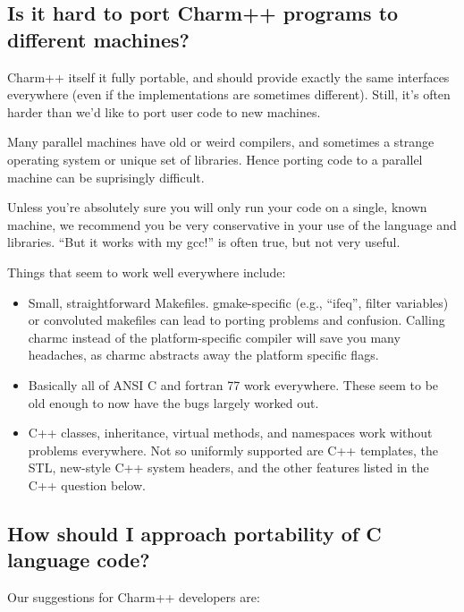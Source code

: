 \subsection{Is it hard to port Charm++ programs to different machines?}

\label{porting}
Charm++ itself it fully portable, and should provide exactly 
the same interfaces everywhere (even if the implementations are 
sometimes different).  Still, it's often harder than we'd like
to port user code to new machines.

Many parallel machines have old or weird compilers, and 
sometimes a strange operating system or unique set of libraries.  
Hence porting code to a parallel machine can be suprisingly difficult.

Unless you're absolutely sure you will only run your code on a
single, known machine, we recommend you be very conservative in 
your use of the language and libraries.  ``But it works with my gcc!''
is often true, but not very useful.

Things that seem to work well everywhere include:
\begin{itemize}
\item Small, straightforward Makefiles.  gmake-specific (e.g.,
``ifeq'', filter variables) or convoluted makefiles can lead 
to porting problems and confusion.  Calling charmc instead
of the platform-specific compiler will save you many headaches,
as charmc abstracts away the platform specific flags.
\item Basically all of ANSI C and fortran 77 work everywhere.  These seem 
to be old enough to now have the bugs largely worked out.
\item C++ classes, inheritance, virtual methods, and namespaces
work without problems everywhere.  Not so uniformly supported 
are C++ templates, the STL, new-style C++ system headers, 
and the other features listed in the C++ question below.
\end{itemize}

\subsection{How should I approach portability of C language code?}

Our suggestions for Charm++ developers are:

